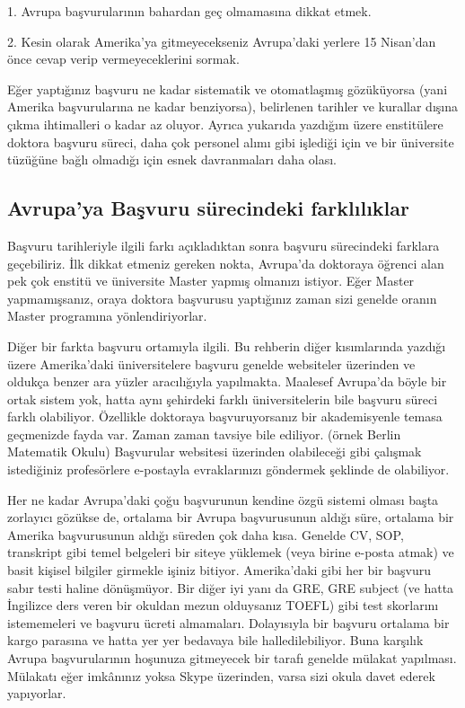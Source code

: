 \documentclass[12pt]{article}
\theoremstyle{break}
\begin{document}
1. Avrupa başvurularının bahardan geç olmamasına dikkat etmek. 

2. Kesin olarak Amerika'ya gitmeyecekseniz Avrupa'daki yerlere 15 Nisan’dan önce cevap verip vermeyeceklerini sormak. 

Eğer yaptığınız başvuru ne kadar sistematik ve otomatlaşmış gözüküyorsa (yani Amerika başvurularına ne kadar benziyorsa), belirlenen tarihler ve kurallar dışına çıkma ihtimalleri o kadar az oluyor. Ayrıca yukarıda yazdığım üzere enstitülere doktora başvuru süreci, daha çok personel alımı gibi işlediği için ve bir üniversite tüzüğüne bağlı olmadığı için esnek davranmaları daha olası. 

\subsection{Avrupa'ya Başvuru sürecindeki farklılıklar}

Başvuru tarihleriyle ilgili farkı açıkladıktan sonra başvuru sürecindeki farklara geçebiliriz. İlk dikkat etmeniz gereken nokta, Avrupa'da doktoraya öğrenci alan pek çok enstitü ve üniversite Master yapmış olmanızı istiyor. Eğer Master yapmamışsanız, oraya doktora başvurusu yaptığınız zaman sizi genelde oranın Master programına yönlendiriyorlar. 

Diğer bir farkta başvuru ortamıyla ilgili. Bu rehberin diğer kısımlarında yazdığı üzere Amerika'daki üniversitelere başvuru genelde websiteler üzerinden ve oldukça benzer ara yüzler aracılığıyla yapılmakta. Maalesef Avrupa'da böyle bir ortak sistem yok, hatta aynı şehirdeki farklı üniversitelerin bile başvuru süreci farklı olabiliyor. Özellikle doktoraya başvuruyorsanız bir akademisyenle temasa geçmenizde fayda var. Zaman zaman tavsiye bile ediliyor. (örnek Berlin Matematik Okulu) Başvurular websitesi üzerinden olabileceği gibi çalışmak istediğiniz profesörlere e-postayla evraklarınızı göndermek şeklinde de olabiliyor. 

Her ne kadar Avrupa'daki çoğu başvurunun kendine özgü sistemi olması başta zorlayıcı gözükse de, ortalama bir Avrupa başvurusunun aldığı süre, ortalama bir Amerika başvurusunun aldığı süreden çok daha kısa. Genelde CV, SOP, transkript gibi temel belgeleri bir siteye yüklemek (veya birine e-posta atmak) ve basit kişisel bilgiler girmekle işiniz bitiyor. Amerika'daki gibi her bir başvuru sabır testi haline dönüşmüyor. Bir diğer iyi yanı da GRE, GRE subject (ve hatta İngilizce ders veren bir okuldan mezun olduysanız TOEFL) gibi test skorlarını istememeleri ve başvuru ücreti almamaları. Dolayısıyla bir başvuru ortalama bir kargo parasına ve hatta yer yer bedavaya bile halledilebiliyor. Buna karşılık Avrupa başvurularının hoşunuza gitmeyecek bir tarafı genelde mülakat yapılması. Mülakatı eğer imkânınız yoksa Skype üzerinden, varsa sizi okula davet ederek yapıyorlar. 
\end{document}
